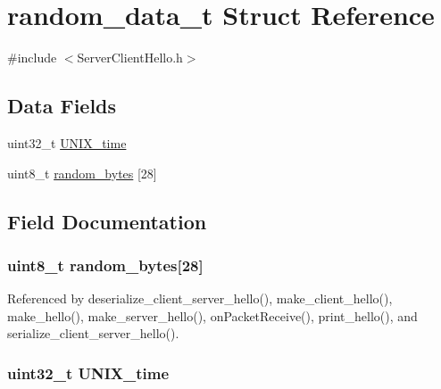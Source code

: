 \hypertarget{structrandom__data__t}{}\section{random\+\_\+data\+\_\+t Struct Reference}
\label{structrandom__data__t}


{\ttfamily \#include $<$Server\+Client\+Hello.\+h$>$}

\subsection*{Data Fields}
\begin{DoxyCompactItemize}
\item 
uint32\+\_\+t \hyperlink{structrandom__data__t_a905c3cf8e7be80f2a3255f99c3ee2fb4}{U\+N\+I\+X\+\_\+time}
\item 
uint8\+\_\+t \hyperlink{structrandom__data__t_a179340bb108f00eb9461163551bb9051}{random\+\_\+bytes} \mbox{[}28\mbox{]}
\end{DoxyCompactItemize}


\subsection{Field Documentation}
\subsubsection[{\texorpdfstring{random\+\_\+bytes}{random_bytes}}]{\setlength{\rightskip}{0pt plus 5cm}uint8\+\_\+t random\+\_\+bytes\mbox{[}28\mbox{]}}\hypertarget{structrandom__data__t_a179340bb108f00eb9461163551bb9051}{}\label{structrandom__data__t_a179340bb108f00eb9461163551bb9051}


Referenced by deserialize\+\_\+client\+\_\+server\+\_\+hello(), make\+\_\+client\+\_\+hello(), make\+\_\+hello(), make\+\_\+server\+\_\+hello(), on\+Packet\+Receive(), print\+\_\+hello(), and serialize\+\_\+client\+\_\+server\+\_\+hello().

\subsubsection[{\texorpdfstring{U\+N\+I\+X\+\_\+time}{UNIX_time}}]{\setlength{\rightskip}{0pt plus 5cm}uint32\+\_\+t U\+N\+I\+X\+\_\+time}\hypertarget{structrandom__data__t_a905c3cf8e7be80f2a3255f99c3ee2fb4}{}\label{structrandom__data__t_a905c3cf8e7be80f2a3255f99c3ee2fb4}


